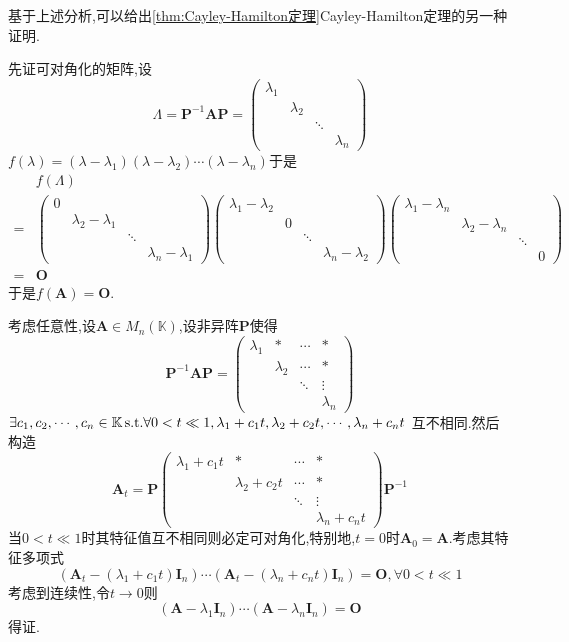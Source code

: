 基于上述分析,可以给出\cref{thm:Cayley-Hamilton定理}Cayley-Hamilton定理的另一种证明.
\begin{brown}
\begin{Proof}
先证可对角化的矩阵,设
\[
\bm{\varLambda}=
\bm{P}^{-1}\bm{AP}=\begin{pmatrix}
    \lambda_1&&&\\
    &\lambda_2&&\\
    &&\ddots&\\
    &&&\lambda_n  
\end{pmatrix}
\]$f\left(\lambda\right)=
\left(
    \lambda-\lambda_1
\right)\left(
    \lambda-\lambda_2
\right)\cdots\left(
    \lambda-\lambda_n
\right)
$于是
\begin{align*}
&f\left(\bm{\varLambda}\right)\\
=&
\begin{pmatrix}
    0&&&\\
    &\lambda_2-\lambda_1&&\\
    &&\ddots&\\
    &&&\lambda_n-\lambda_1
\end{pmatrix}\begin{pmatrix}
    \lambda_1-\lambda_2&&&\\
    &0&&\\
    &&\ddots&\\
    &&&\lambda_n-\lambda_2
\end{pmatrix}
\begin{pmatrix}
    \lambda_1-\lambda_n&&&\\
    &\lambda_2-\lambda_n&&\\
    &&\ddots&\\
    &&&0
\end{pmatrix}\\
=&\bm{O}
\end{align*}于是$f\left(\bm{A}\right)=\bm{O}.$

考虑任意性,设$\bm{A}\in M_n\left(\mathbb{K}\right)$,设非异阵$\bm{P}$使得
\[
\bm{P}^{-1}\bm{AP}=\begin{pmatrix}
    \lambda_1&*&\cdots&*\\
    &\lambda_2&\cdots&*\\
    &&\ddots&\vdots\\
    &&&\lambda_n
\end{pmatrix}
\]$\exists c_1,c_2,\cdots,c_n\in\mathbb{K}\,\textup{s.t.}\forall 0<t\ll 1,\lambda_1+c_1t,
\lambda_2+c_2t,\cdots,\lambda_n+c_nt$
互不相同.然后构造
\[
\bm{A}_t=   
\bm{P}\begin{pmatrix}
    \lambda_1+c_1t&*&\cdots&*\\
    &\lambda_2+c_2t&\cdots&*\\
    &&\ddots&\vdots\\
    &&&\lambda_n+c_nt
\end{pmatrix}\bm{P}^{-1}
\]当$0<t\ll 1$时其特征值互不相同则必定可对角化,特别地,$t=0$时$\bm{A}_0=\bm{A}.$考虑其特征多项式
\[
\left(
    \bm{A}_t-\left(\lambda_1+c_1t\right)\bm{I}_n
\right)\cdots\left(
    \bm{A}_t-\left(\lambda_n+c_nt\right)\bm{I}_n    
\right)=\bm{O},\forall 0<t\ll 1
\]
考虑到连续性,令$t\to 0$则
\[
\left(
    \bm{A}-\lambda_1\bm{I}_n
\right)\cdots\left(
    \bm{A}-\lambda_n\bm{I}_n
\right)=\bm{O}
\]得证.
\end{Proof}
\end{brown}
\newpage
